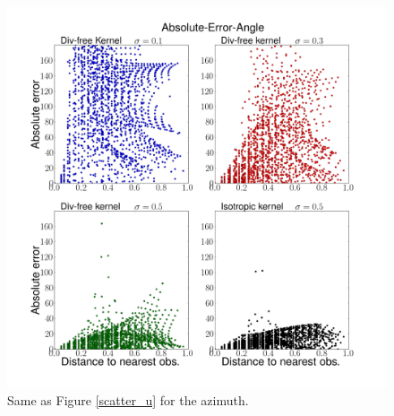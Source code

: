\documentclass[12pt,a4paper]{article}%
\begin{document}
\begin{figure}
\noindent\includegraphics[width=36
pc]{plots/Absolute-Error-Angle-scatter.png}
\caption{Same as Figure \ref{scatter_u} for the azimuth. }
\label{scatter_angle}
\end{figure}
\end{document}
